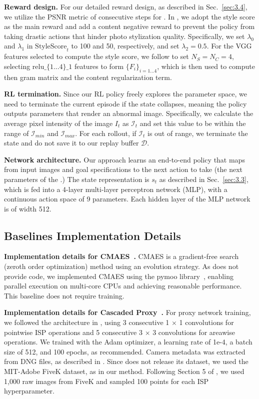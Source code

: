\noindent\textbf{Reward design.} For our detailed reward design, as described in Sec.~\ref{sec:3.4}, we utilize the PSNR metric of consecutive steps for \taskPFT. In \taskPST, we adopt the style score as the main reward and add a content negative reward to prevent the policy from taking drastic actions that hinder photo stylization quality. Specifically, we set $\lambda_0$ and $\lambda_1$ in $\text{StyleScore}_t$ to 100 and 50, respectively, and set $\lambda_2 = 0.5$. For the VGG features selected to compute the style score, we follow \cite{huang2017arbitrary-adain} to set $N_S = N_C = 4$, selecting $\text{relu\_\{1...4\}\_1}$ features to form $\{F_i\}_{i=1...4}$, which is then used to compute then gram matrix and the content regularization term.

\noindent\textbf{RL termination.} Since our RL policy freely explores the \pipeline parameter space, we need to terminate the current episode if the state collapses, meaning the policy outputs parameters that render an abnormal image. Specifically, we calculate the average pixel intensity of the image $I_t$ as $\mathcal{I}_t$ and set this value to be within the range of $\mathcal{I}_{min}$ and $\mathcal{I}_{max}$. For each rollout, if $\mathcal{I}_t$ is out of range, we terminate the state and do not save it to our replay buffer $\mathcal{D}$.

\noindent\textbf{Network architecture.} Our approach learns an end-to-end policy that maps from input images and goal specifications to the next action to take (the next parameters of the \pipeline.) The state representation is $s_t$ as described in Sec.~\ref{sec:3.3}, which is fed into a 4-layer multi-layer perceptron network (MLP), with a continuous action space of 9 parameters. Each hidden layer of the MLP network is of width 512.




\subsection{Baselines Implementation Details}
\noindent\textbf{Implementation details for CMAES~\cite{hansen2006cma, mosleh2020hardware}.} 
CMAES is a gradient-free search (zeroth order optimization) method using an evolution strategy.  As \cite{mosleh2020hardware} does not provide code, we implemented CMAES using the pymoo library~\cite{pymoo}, enabling parallel execution on multi-core CPUs and achieving reasonable performance. This baseline does not require training.


\noindent\textbf{Implementation details for Cascaded Proxy~\cite{tseng2022neural}.} 
For proxy network training, we followed the architecture in \cite{tseng2022neural}, using 3 consecutive 1 $\times$ 1 convolutions for pointwise ISP operations and 5 consecutive 3 $\times$ 3 convolutions for areawise operations. We trained with the Adam optimizer, a learning rate of 1e-4, a batch size of 512, and 100 epochs, as recommended. Camera metadata was extracted from DNG files, as described in \cite{tseng2022neural}.
Since \cite{tseng2022neural} does not release its dataset, we used the MIT-Adobe FiveK dataset, as in our method. Following Section 5 of \cite{tseng2022neural}, we used 1,000 raw images from FiveK and sampled 100 points for each ISP hyperparameter.


